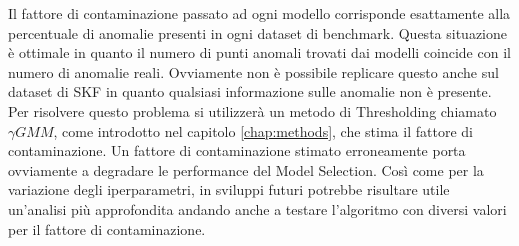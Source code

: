 Il fattore di contaminazione passato ad ogni modello corrisponde esattamente alla percentuale di anomalie presenti in ogni dataset di benchmark. Questa situazione è ottimale in quanto il numero di punti anomali trovati dai modelli coincide con il numero di anomalie reali. Ovviamente non è possibile replicare questo anche sul dataset di SKF in quanto qualsiasi informazione sulle anomalie non è presente. Per risolvere questo problema si utilizzerà un metodo di Thresholding chiamato ${\gamma}GMM$, come introdotto nel capitolo \ref{chap:methods}, che stima il fattore di contaminazione. Un fattore di contaminazione stimato erroneamente porta ovviamente a degradare le performance del Model Selection. Così come per la variazione degli iperparametri, in sviluppi futuri potrebbe risultare utile un'analisi più approfondita andando anche a testare l'algoritmo con diversi valori per il fattore di contaminazione.



